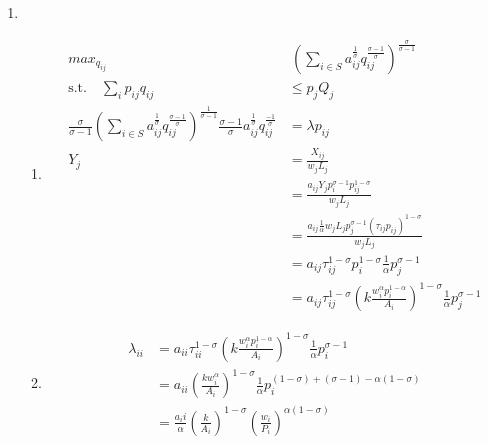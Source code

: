 \documentclass{article}
\begin{document}
\begin{enumerate}
    \item
    \begin{enumerate} \item
    \begin{align*}
        max_{q_{ij}} &\ \left(\sum_{i \in S} a_{ij}^{\frac{1}{\sigma}} q_{ij}^{\frac{\sigma - 1}{\sigma}}\right)^{\frac{\sigma}{\sigma - 1}}\\
        \text{s.t.} \quad \sum_i p_{ij} q_{ij} &\le p_j Q_j\\
        \frac{\sigma}{\sigma - 1} \left( \sum_{i \in S} a_{ij}^{\frac{1}{\sigma}} q_{ij}^{\frac{\sigma -1}{\sigma}}\right)^{\frac{1}{\sigma - 1}} \frac{\sigma - 1}{\sigma} a_{ij}^{\frac{1}{\sigma}}q_{ij}^{\frac{-1}{\sigma}} &= \lambda p_{ij} \tag{FOC}\\
        Y_j &= \frac{X_{ij}}{w_j L_j}\\
        &= \frac{a_{ij} Y_j p_i^{\sigma - 1}p_{ij}^{1 - \sigma}}{w_j L_j}\\
        &= \frac{a_{ij} \frac{1}{\alpha} w_j L_j p_j^{\sigma - 1} (\tau_{ij} p_{ij})^{1 - \sigma}}{w_j L_j}\\
        &= a_{ij} \tau_{ij}^{1 - \sigma} p_i^{1 - \sigma} \frac{1}{\alpha} p_j^{\sigma - 1}\\
        &= a_{ij} \tau_{ij}^{1 - \sigma} \left(k \frac{w_i^\alpha p_i^{1 - \alpha}}{A_i}\right)^{1 - \sigma} \frac{1}{\alpha} p_j^{\sigma -1}
    \end{align*}
    \item
    \begin{align*}
        \lambda_{ii} &= a_{ii} \tau_{ii}^{1 - \sigma} \left(k \frac{w_i^\alpha p_i^{1 - \alpha}}{A_i}\right)^{1 - \sigma} \frac{1}{\alpha} p_i^{\sigma - 1}\\
        &= a_{ii}\left(\frac{k w_i^\alpha}{A_i}\right)^{1 - \sigma} \frac{1}{\alpha} p_i^{(1 - \sigma) + (\sigma - 1) - \alpha(1 - \sigma)}\\
        &= \frac{a_ii}{\alpha} \left(\frac{k}{A_i}\right)^{1 - \sigma} \left(\frac{w_i}{P_i}\right)^{\alpha(1 - \sigma)}

\end{align*}
\end{enumerate}
\end{enumerate}
\end{document}
